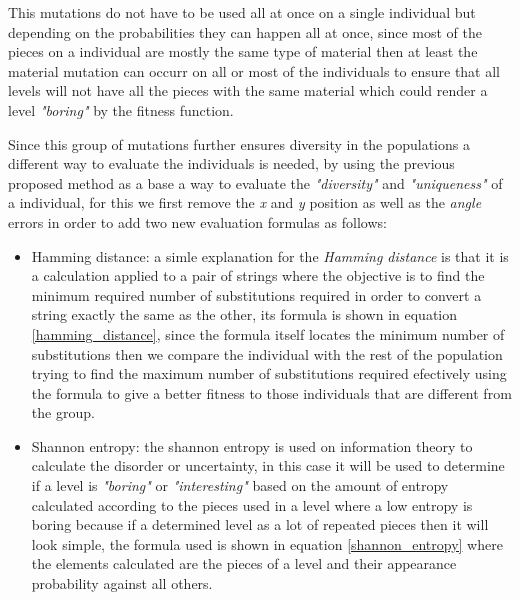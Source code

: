 \documentclass[conference]{IEEEtran}
\begin{document}
    This mutations do not have to be used all at once on a single individual but
    depending on the probabilities they can happen all at once, since most of the
    pieces on a individual are mostly the same type of material then at least the
    material mutation can occurr on all or most of the individuals to ensure that
    all levels will not have all the pieces with the same material which could
    render a level \textit{"boring"} by the fitness function.
    
    Since this group of mutations further ensures diversity in the populations a
    different way to evaluate the individuals is needed, by using the previous
    proposed method as a base a way to evaluate the \textit{"diversity"} and
    \textit{"uniqueness"} of a individual, for this we first remove the \textit{x}
    and \textit{y} position as well as the \textit{angle} errors in order to add two
    new evaluation formulas as follows:
    
    \begin{itemize}
        \item Hamming distance: a simle explanation for the \textit{Hamming
        distance} is that it is a calculation applied to a pair of strings where the
        objective is to find the minimum required number of substitutions required in
        order to convert a string exactly the same as the other, its formula is
        shown in equation \ref{hamming_distance}, since the formula itself locates
        the minimum number of substitutions then we compare the individual
        with the rest of the population trying to find the maximum number of
        substitutions required efectively using the formula to give a better fitness
        to those individuals that are different from the group.
        \item Shannon entropy: the shannon entropy is used on information theory to
        calculate the disorder or uncertainty, in this case it will be used to
        determine if a level is \textit{"boring"} or \textit{"interesting"} based on
        the amount of entropy calculated according to the pieces used in a level
        where a low entropy is boring because if a determined level as a lot of
        repeated pieces then it will look simple, the formula used is shown in
        equation \ref{shannon_entropy} where the elements calculated are the pieces
        of a level and their appearance probability against all others.
    \end{itemize}
    
\end{document}
